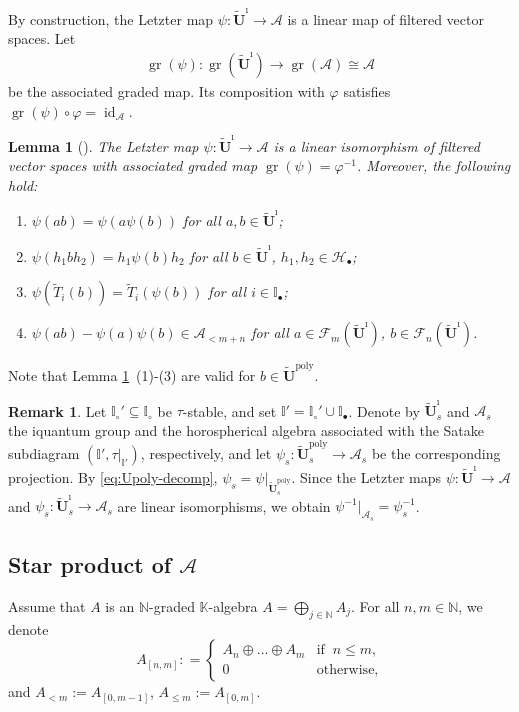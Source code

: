 \documentclass[a4paper,reqno,12pt]{amsart}
\numberwithin{equation}{section}
\newtheorem{lemma}[proposition]{Lemma}
\theoremstyle{definition}
\newtheorem{remark}[proposition]{Remark}
\theoremstyle{plain}
\theoremstyle{definition}
\def\K{\mathbb K}
\def\N{\mathbb N}
\def\I{\mathbb I}
\def\bI{\I_\bullet}
\def\wI{\I_\circ}
\def\tU{\widetilde{\mathbf U}}
\def\tUi{\widetilde{\mathbf U}^{\imath}}
\def\tTD{\widetilde T}
\def\cA{\mathcal A}
\def\cF{\mathcal F}
\def\cH{\mathcal H}
\newcommand{\id}{\operatorname{id}}
\newcommand{\poly}{\mathrm{poly}}
\newcommand{\gr}{\operatorname{gr}}
\begin{document}
By construction, the Letzter map $\psi:\tUi\rightarrow \cA$ is a linear map of filtered vector spaces. Let
\begin{align*}
  \gr(\psi):\gr(\tUi)\rightarrow \gr(\cA)\cong \cA
\end{align*}
be the associated graded map. Its composition with $\varphi$ satisfies $\gr(\psi)\circ \varphi=\id_\cA$.

\begin{lemma} [{\cite[Lemmas 2.10 and 2.11]{KY21}}]
    \label{lem:Letzter-props}
    The Letzter map $\psi:\tUi\rightarrow \cA$ is a linear isomorphism of filtered vector spaces with associated graded map $\gr(\psi)=\varphi^{-1}$. Moreover, the following hold:
    \begin{enumerate}
      \item $\psi(ab) = \psi(a\psi(b))$ for all $a,b\in \tUi$;
      \item $\psi(h_1bh_2) = h_1\psi(b) h_2$ for all $b\in \tUi$, $h_1,h_2\in \cH_\bullet$;
      \item $\psi(\tTD_i(b))=\tTD_i(\psi(b))$ for all $i\in \bI$;
      \item $\psi(ab)-\psi(a)\psi(b)\in \cA_{<m+n}$ for all $a\in \cF_m(\tUi)$, $b\in \cF_n(\tUi)$.  
    \end{enumerate}
\end{lemma}
Note that Lemma \ref{lem:Letzter-props}~(1)-(3) are valid for $b\in\tU^\poly$.

\begin{remark}\label{rem:local Letzter and Letzter}
Let $\wI'\subseteq\wI$ be $\tau$-stable, and set
$\I'=\wI'\cup\bI$. Denote by $\tUi_s$ and $\cA_s$ the
iquantum group and the horospherical algebra associated with
the Satake subdiagram $(\I',\tau|_{\I'})$, respectively, and let $\psi_s:\tU_s^\poly\longrightarrow\cA_s$
be the corresponding projection. By \eqref{eq:Upoly-decomp}, $\psi_s=\psi|_{\tU_s^\poly}$.
Since the Letzter maps $\psi:\tUi\rightarrow\cA$ and $\psi_s:\tUi_s\rightarrow\cA_s$ are linear isomorphisms, we obtain 
$\psi^{-1}|_{\cA_s}=\psi_s^{-1}$.
\end{remark}
\subsection{Star product of \texorpdfstring{$\cA$}{A}}
Assume that $A$ is an $\N$-graded $\K$-algebra $A=\bigoplus_{j\in \N} A_j$. For all $n, m \in \N$, we denote 
\[
A_{[n,m]} : = 
\begin{cases}
A_n \oplus \ldots \oplus A_m &\mbox{if} \; \; n \leq m,
\\
0 &\mbox{otherwise},
\end{cases}
\]
and $A_{<m} := A_{[0, m-1]}$, $A_{\le m}:= A_{[0,m]}$. 
\end{document}
